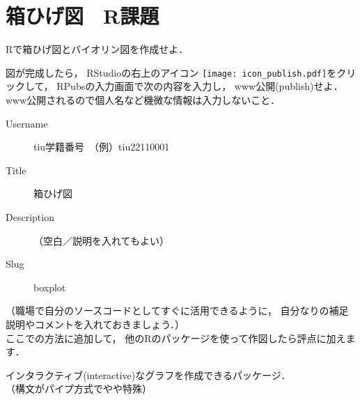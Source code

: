 \MyFrame{}
{

}

\section{箱ひげ図　R課題}

{
  \MyProblem
  {
    Rで箱ひげ図とバイオリン図を作成せよ．
  }
}

\MyFrame{\insertsection}
{
  \MySolution
  {
  }
}

\MyFrame{\insertsection}
{
  図が完成したら，
  RStudioの右上のアイコン
  \texttt{[image: icon\_publish.pdf]}をクリックして，
  RPubsの入力画面で次の内容を入力し，
  www公開(publish)せよ．\\
  \alert{www公開されるので個人名など機微な情報は入力しないこと．}
  \begin{description}
    \item[Username] tiu学籍番号　（例）tiu22110001\\
    \item[Title] 箱ひげ図\\
    \item[Description] （空白／説明を入れてもよい）\\
    \item[Slug] boxplot
  \end{description}
  （職場で自分のソースコードとしてすぐに活用できるように，
    自分なりの補足説明やコメントを入れておきましょう．）\\
    ここでの方法に追加して，
    他のRのパッケージを使って作図したら評点に加えます．
}

{
  インタラクティブ(interactive)なグラフを作成できるパッケージ．\\
  （構文がパイプ方式でやや特殊）
}



